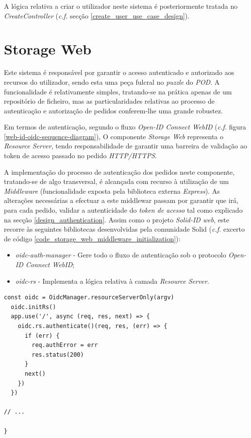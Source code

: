 A lógica relativa a criar o utilizador neste sistema é posteriormente tratada no \emph{CreateController} (\emph{c.f.} secção \ref{create_user_use_case_design}).

\section{Storage Web}
Este sistema é responsável por garantir o acesso autenticado e autorizado aos recursos do utilizador, sendo esta uma peça fulcral no \emph{puzzle} do \emph{\acrshort{POD}}. A funcionalidade é relativamente simples, tratando-se na prática apenas de um repositório de ficheiro, mas as particularidades relativas ao processo de autenticação e autorização de pedidos conferem-lhe uma grande robustez.

Em termos de autenticação, segundo o fluxo \emph{Open-ID Connect WebID} (\emph{c.f.} figura \ref{web-id-oidc-sequence-diagram}), O componente \emph{Storage Web} representa o \emph{Resource Server}, tendo responsabilidade de garantir uma barreira de validação ao token de acesso passado no pedido \emph{HTTP/HTTPS}.

A implementação do processo de autenticação dos pedidos neste componente, tratando-se de algo transversal, é alcançada com recurso à utilização de um \emph{Middleware} (funcionalidade exposta pela biblioteca externa \emph{Express}). As alterações necessárias a efectuar a este middlewar passam por garantir que irá, para cada pedido, validar a autenticidade do \emph{token de acesso} tal como explicado na secção \ref{design_authentication}.
Assim como o projeto \emph{Solid-ID web}, este recorre às seguintes bibliotecas desenvolvidas pela comunidade Solid (\emph{c.f.} excerto de código \ref{code_storage_web_middleware_initialization}):
\begin{itemize}
    \item \emph{oidc-auth-manager} - Gere todo o fluxo de autenticação sob o protocolo \emph{Open-ID Connect WebID};
    \item \emph{oidc-rs} - Implementa a lógica relativa à camada \emph{Resource Server}.
\end{itemize}

\begin{lstlisting}[caption={Inicialização do \emph{Middleware} de autenticação de pedidos \emph{\acrshort{REST}}}, label={code_storage_web_middleware_initialization}]
  const oidc = OidcManager.resourceServerOnly(argv)
  oidc.initRs()
  app.use('/', async (req, res, next) => {
    oidc.rs.authenticate()(req, res, (err) => {
      if (err) {
        req.authError = err
        res.status(200)
      }
      next()
    })
  })

// ...

}

\end{lstlisting}

